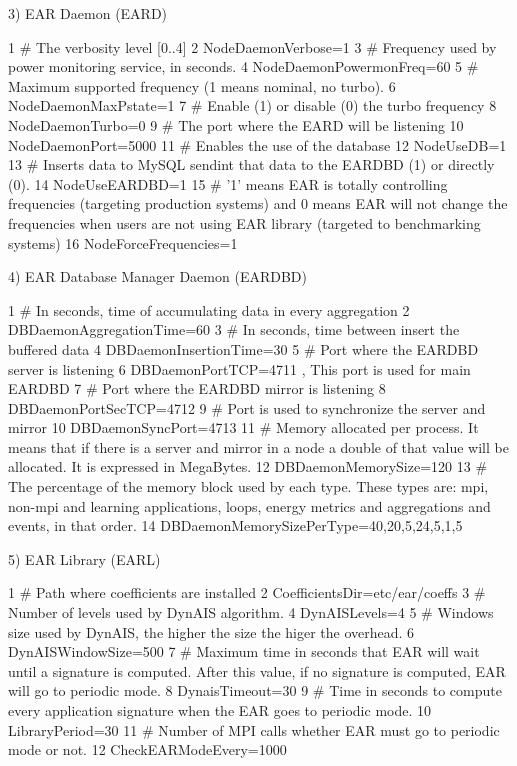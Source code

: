 3) E\+AR Daemon (E\+A\+RD)


\begin{DoxyCode}
1 # The verbosity level [0..4]
2 NodeDaemonVerbose=1
3 # Frequency used by power monitoring service, in seconds.
4 NodeDaemonPowermonFreq=60
5 # Maximum supported frequency (1 means nominal, no turbo).
6 NodeDaemonMaxPstate=1
7 # Enable (1) or disable (0) the turbo frequency
8 NodeDaemonTurbo=0
9 # The port where the EARD will be listening
10 NodeDaemonPort=5000
11 # Enables the use of the database
12 NodeUseDB=1
13 # Inserts data to MySQL sendint that data to the EARDBD (1) or directly (0).
14 NodeUseEARDBD=1
15 # '1' means EAR is totally controlling frequencies (targeting production systems) and 0 means EAR will not
       change the frequencies when users are not using EAR library (targeted to benchmarking systems)
16 NodeForceFrequencies=1
\end{DoxyCode}


4) E\+AR Database Manager Daemon (E\+A\+R\+D\+BD)


\begin{DoxyCode}
1 # In seconds, time of accumulating data in every aggregation
2 DBDaemonAggregationTime=60
3 # In seconds, time between insert the buffered data
4 DBDaemonInsertionTime=30
5 # Port where the EARDBD server is listening
6 DBDaemonPortTCP=4711 , This port is used for main EARDBD
7 # Port where the EARDBD mirror is listening
8 DBDaemonPortSecTCP=4712
9 # Port is used to synchronize the server and mirror
10 DBDaemonSyncPort=4713
11 # Memory allocated per process. It means that if there is a server and mirror in a node a double of that
       value will be allocated. It is expressed in MegaBytes.
12 DBDaemonMemorySize=120
13 # The percentage of the memory block used by each type. These types are: mpi, non-mpi and learning
       applications, loops, energy metrics and aggregations and events, in that order.
14 DBDaemonMemorySizePerType=40,20,5,24,5,1,5
\end{DoxyCode}


5) E\+AR Library (E\+A\+RL)


\begin{DoxyCode}
1 # Path where coefficients are installed
2 CoefficientsDir=etc/ear/coeffs
3 # Number of levels used by DynAIS algorithm.
4 DynAISLevels=4
5 # Windows size used by DynAIS, the higher the size the higer the overhead.
6 DynAISWindowSize=500
7 # Maximum time in seconds that EAR will wait until a signature is computed. After this value, if no
       signature is computed, EAR will go to periodic mode.
8 DynaisTimeout=30
9 # Time in seconds to compute every application signature when the EAR goes to periodic mode.
10 LibraryPeriod=30
11 # Number of MPI calls whether EAR must go to periodic mode or not.
12 CheckEARModeEvery=1000
\end{DoxyCode}


